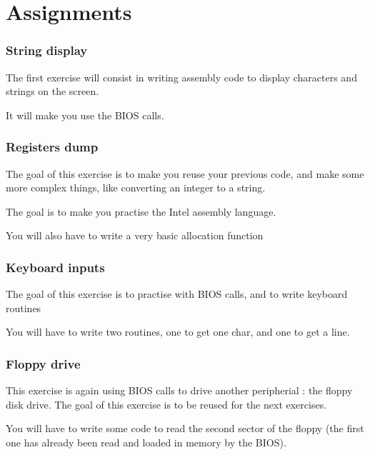 %
%

\section{Assignments}


\begin{frame}
  \frametitle{String display}

  The first exercise will consist in writing assembly code to display characters and strings on the screen.

  \-

  It will make you use the BIOS calls.

\end{frame}


\begin{frame}
  \frametitle{Registers dump}

  The goal of this exercise is to make you reuse your previous code, and make some more complex things, like converting an integer to a string.

  \-

  The goal is to make you practise the Intel assembly language.

  \-

  You will also have to write a very basic allocation function

\end{frame}


\begin{frame}
  \frametitle{Keyboard inputs}

  The goal of this exercise is to practise with BIOS calls, and to write keyboard routines

  \-

  You will have to write two routines, one to get one char, and one to get a line.
\end{frame}


\begin{frame}
  \frametitle{Floppy drive}

  This exercise is again using BIOS calls to drive another peripherial : the floppy disk drive. The goal of this exercise is to be reused for the next exercises.

  \-

  You will have to write some code to read the second sector of the floppy (the first one has already been read and loaded in memory by the BIOS).

\end{frame}

